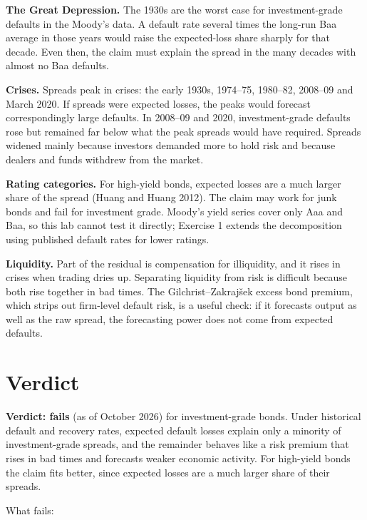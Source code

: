 \textbf{The Great Depression.} The 1930s are the worst case for investment-grade defaults in the Moody's data. A default rate several times the long-run Baa average in those years would raise the expected-loss share sharply for that decade. Even then, the claim must explain the spread in the many decades with almost no Baa defaults.

\textbf{Crises.} Spreads peak in crises: the early 1930s, 1974--75, 1980--82, 2008--09 and March 2020. If spreads were expected losses, the peaks would forecast correspondingly large defaults. In 2008--09 and 2020, investment-grade defaults rose but remained far below what the peak spreads would have required. Spreads widened mainly because investors demanded more to hold risk and because dealers and funds withdrew from the market.

\textbf{Rating categories.} For high-yield bonds, expected losses are a much larger share of the spread (Huang and Huang 2012). The claim may work for junk bonds and fail for investment grade. Moody's yield series cover only Aaa and Baa, so this lab cannot test it directly; Exercise 1 extends the decomposition using published default rates for lower ratings.

\textbf{Liquidity.} Part of the residual is compensation for illiquidity, and it rises in crises when trading dries up. Separating liquidity from risk is difficult because both rise together in bad times. The Gilchrist--Zakraj\v{s}ek excess bond premium, which strips out firm-level default risk, is a useful check: if it forecasts output as well as the raw spread, the forecasting power does not come from expected defaults.

\section{Verdict}
\label{sec:17-verdict}

\begin{callout}
\textbf{Verdict: fails} (as of October 2026) for investment-grade bonds. Under historical default and recovery rates, expected default losses explain only a minority of investment-grade spreads, and the remainder behaves like a risk premium that rises in bad times and forecasts weaker economic activity. For high-yield bonds the claim fits better, since expected losses are a much larger share of their spreads.
\end{callout}

What fails:

